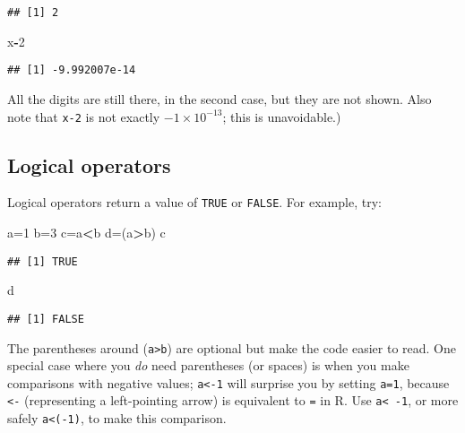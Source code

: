 \documentclass[11pt,]{article}
\newenvironment{Shaded}{\begin{snugshade}}{\end{snugshade}}
\newcommand{\DecValTok}[1]{\textcolor[rgb]{0.00,0.00,0.81}{#1}}
\newcommand{\OperatorTok}[1]{\textcolor[rgb]{0.81,0.36,0.00}{\textbf{#1}}}
\newcommand{\NormalTok}[1]{#1}
\begin{document}
\begin{verbatim}
## [1] 2
\end{verbatim}

\begin{Shaded}
\begin{Highlighting}[]
\NormalTok{x}\OperatorTok{-}\DecValTok{2}
\end{Highlighting}
\end{Shaded}

\begin{verbatim}
## [1] -9.992007e-14
\end{verbatim}

All the digits are still there, in the second case, but they are not
shown. Also note that \texttt{x-2} is not exactly
\(-1 \times 10^{-13}\); this is unavoidable.)

\subsection{Logical operators}\label{logical-operators}

Logical operators return a value of \texttt{TRUE} or \texttt{FALSE}. For
example, try:

\begin{Shaded}
\begin{Highlighting}[]
\NormalTok{a=}\DecValTok{1}
\NormalTok{b=}\DecValTok{3}
\NormalTok{c=a}\OperatorTok{<}\NormalTok{b}
\NormalTok{d=(a}\OperatorTok{>}\NormalTok{b)}
\NormalTok{c}
\end{Highlighting}
\end{Shaded}

\begin{verbatim}
## [1] TRUE
\end{verbatim}

\begin{Shaded}
\begin{Highlighting}[]
\NormalTok{d}
\end{Highlighting}
\end{Shaded}

\begin{verbatim}
## [1] FALSE
\end{verbatim}

The parentheses around (\texttt{a\textgreater{}b}) are optional but make
the code easier to read. One special case where you \emph{do} need
parentheses (or spaces) is when you make comparisons with negative
values; \texttt{a\textless{}-1} will surprise you by setting
\texttt{a=1}, because \texttt{\textless{}-} (representing a
left-pointing arrow) is equivalent to \texttt{=} in R. Use
\texttt{a\textless{}\ -1}, or more safely \texttt{a\textless{}(-1)}, to
make this comparison.
\end{document}
